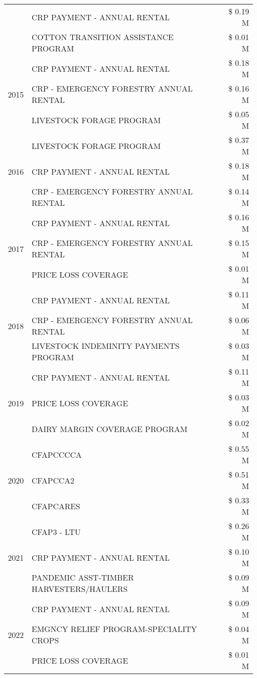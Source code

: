 \begin{tabular}{llr}
 & CRP PAYMENT - ANNUAL RENTAL & \$ 0.19 M \\
 & COTTON TRANSITION ASSISTANCE PROGRAM & \$ 0.01 M \\
\cline{1-3}
\multirow[t]{3}{*}{2015} & CRP PAYMENT - ANNUAL RENTAL & \$ 0.18 M \\
 & CRP - EMERGENCY FORESTRY ANNUAL RENTAL & \$ 0.16 M \\
 & LIVESTOCK FORAGE PROGRAM & \$ 0.05 M \\
\cline{1-3}
\multirow[t]{3}{*}{2016} & LIVESTOCK FORAGE PROGRAM & \$ 0.37 M \\
 & CRP PAYMENT - ANNUAL RENTAL & \$ 0.18 M \\
 & CRP - EMERGENCY FORESTRY ANNUAL RENTAL & \$ 0.14 M \\
\cline{1-3}
\multirow[t]{3}{*}{2017} & CRP PAYMENT - ANNUAL RENTAL & \$ 0.16 M \\
 & CRP - EMERGENCY FORESTRY ANNUAL RENTAL & \$ 0.15 M \\
 & PRICE LOSS COVERAGE & \$ 0.01 M \\
\cline{1-3}
\multirow[t]{3}{*}{2018} & CRP PAYMENT - ANNUAL RENTAL & \$ 0.11 M \\
 & CRP - EMERGENCY FORESTRY ANNUAL RENTAL & \$ 0.06 M \\
 & LIVESTOCK INDEMINITY PAYMENTS PROGRAM & \$ 0.03 M \\
\cline{1-3}
\multirow[t]{3}{*}{2019} & CRP PAYMENT - ANNUAL RENTAL & \$ 0.11 M \\
 & PRICE LOSS COVERAGE & \$ 0.03 M \\
 & DAIRY MARGIN COVERAGE PROGRAM & \$ 0.02 M \\
\cline{1-3}
\multirow[t]{3}{*}{2020} & CFAPCCCCA & \$ 0.55 M \\
 & CFAPCCA2 & \$ 0.51 M \\
 & CFAPCARES & \$ 0.33 M \\
\cline{1-3}
\multirow[t]{3}{*}{2021} & CFAP3 - LTU & \$ 0.26 M \\
 & CRP PAYMENT - ANNUAL RENTAL & \$ 0.10 M \\
 & PANDEMIC ASST-TIMBER HARVESTERS/HAULERS & \$ 0.09 M \\
\cline{1-3}
\multirow[t]{3}{*}{2022} & CRP PAYMENT - ANNUAL RENTAL & \$ 0.09 M \\
 & EMGNCY RELIEF PROGRAM-SPECIALITY CROPS & \$ 0.04 M \\
 & PRICE LOSS COVERAGE & \$ 0.01 M \\
\cline{1-3}
\bottomrule
\end{tabular}
